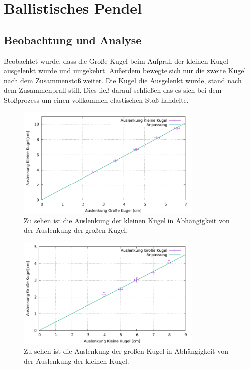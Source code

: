 \section{Ballistisches Pendel}\label{kap:Bal}
\subsection*{Beobachtung und Analyse}
Beobachtet wurde, dass die Große Kugel beim Aufprall der kleinen Kugel ausgelenkt wurde und umgekehrt. Außerdem bewegte sich nur die zweite Kugel nach dem Zusammenstoß weiter. Die Kugel die Ausgelenkt wurde, stand nach dem Zusammenprall still. Dies ließ darauf schließen das es sich bei dem Stoßprozess um einen vollkommen elastischen Stoß handelte.

\begin{figure}[h]
	\centering
	\includegraphics[width=0.8\textwidth]{res/GrosKlein.pdf}
	\caption{Zu sehen ist die Auslenkung der kleinen Kugel in Abhängigkeit von der Auslenkung der großen Kugel.}
	\label{fig:grosklein}
\end{figure}
\begin{figure}[h]
	\centering
	\includegraphics[width=0.8\textwidth]{res/KleinGros.pdf}
	\caption{Zu sehen ist die Auslenkung der großen Kugel in Abhängigkeit von der Auslenkung der kleinen Kugel.}
	\label{fig:kleingros}
\end{figure}

